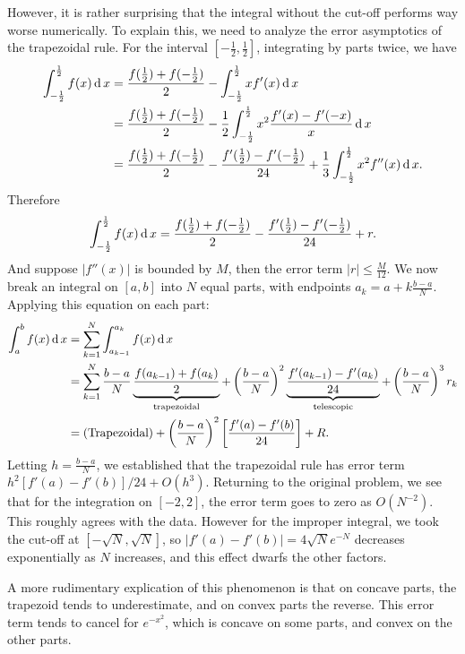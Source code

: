\documentclass{homework}
\begin{document}
\begin{problem}
However, it is rather surprising that the
integral without the cut-off performs way worse
numerically. To explain this, we need to analyze
the error asymptotics of the trapezoidal rule.
For the interval \([-\frac12,\frac12]\),
integrating by parts twice, we have
\[\begin{aligned}
\int_{-\frac12}^{\frac12} f(x) \mathop{\textnormal{d}}\!\, x
&= \frac{f(\frac12) + f(-\frac12)}{2}
 - \int_{-\frac12}^{\frac12} xf'(x)\mathop{\textnormal{d}}\!\, x\\
&= \frac{f(\frac12) + f(-\frac12)}{2}
 - \frac12\int_{-\frac12}^{\frac12} x^2\frac{f'(x) - f'(-x)}x\mathop{\textnormal{d}}\!\, x\\
&= \frac{f(\frac12) + f(-\frac12)}{2}
 - \frac{f'(\frac12)-f'(-\frac12)}{24}
 + \frac13 \int_{-\frac12}^{\frac12} x^2f''(x) \mathop{\textnormal{d}}\!\, x.
\end{aligned}\]
Therefore
\[\int_{-\frac12}^{\frac12} f(x) \mathop{\textnormal{d}}\!\, x
= \frac{f(\frac12) + f(-\frac12)}{2}
- \frac{f'(\frac12)-f'(-\frac12)}{24}
+ r.\]
And suppose \(|f''(x)|\) is bounded by \(M\), then
the error term \(|r| \le \frac{M}{12}\). We now
break an integral on \([a,b]\) into \(N\) equal
parts, with endpoints \(a_k = a + k\frac{b-a}{N}\).
Applying this equation on each part:
\[\begin{aligned}
\int_a^b f(x) \mathop{\textnormal{d}}\!\, x
&= \sum_{k = 1}^N \int_{a_{k-1}}^{a_k} f(x) \mathop{\textnormal{d}}\!\, x\\
&= \sum_{k = 1}^N
\frac{b-a}{N}\underbrace{\frac{f(a_{k-1}) + f(a_k)}{2}}_{\text{trapezoidal}}
+ \left(\frac{b-a}{N}\right)^2\underbrace{\frac{f'(a_{k-1}) - f'(a_k)}{24}}_{\text{telescopic}}
+ \left(\frac{b-a}{N}\right)^3 r_k\\
&= (\text{Trapezoidal}) + \left(\frac{b-a}{N}\right)^2
\left[\frac{f'(a) - f'(b)}{24}\right] + R.
\end{aligned}\]
Letting \(h = \frac{b-a}{N}\), we established
that the trapezoidal rule has error term
\(h^2[f'(a) - f'(b)]/24 + O(h^3)\). Returning
to the original problem, we see that for the
integration on \([-2,2]\), the error term goes
to zero as \(O(N^{-2})\). This roughly agrees
with the data. However for the improper
integral, we took the cut-off at \([-\sqrt N, \sqrt N]\),
so \(|f'(a) - f'(b)| = 4\sqrt Ne^{-N}\) decreases
exponentially as \(N\) increases, and this effect
dwarfs the other factors.

A more rudimentary explication of this phenomenon
is that on concave parts, the trapezoid tends
to underestimate, and on convex parts the reverse.
This error term tends to cancel for \(e^{-x^2}\),
which is concave on some parts, and convex on the
other parts.
\end{problem}
\end{document}
